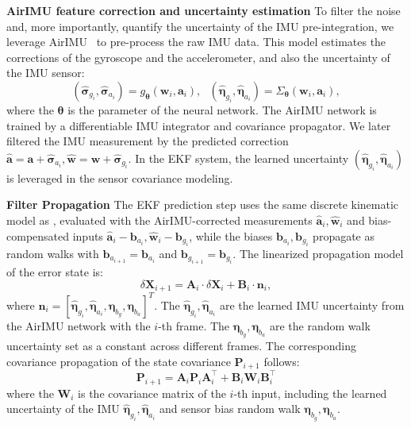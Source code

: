 \textbf{AirIMU feature correction and uncertainty estimation}
To filter the noise and, more importantly, quantify the uncertainty of the IMU pre-integration, we leverage AirIMU~\cite{qiu2023airimu} to pre-process the raw IMU data.
This model estimates the corrections of the gyroscope and the accelerometer, and also the uncertainty of the IMU sensor:
\begin{equation}
    \left(\hat{\boldsymbol{\sigma}}_{g_i}, \hat{\boldsymbol{\sigma}}_{a_i}\right) = g_{\boldsymbol{\theta}}\left(\mathbf{w}_i, \mathbf{a}_i\right), \ \ \  \left(\hat{\boldsymbol{\eta}}_{g_i}, \hat{\boldsymbol{\eta}}_{a_i}\right) = \Sigma_{\boldsymbol{\theta}}\left(\mathbf{w}_i, \mathbf{a}_i\right),
\end{equation}
where the $\mathbf{\theta}$ is the parameter of the neural network. The AirIMU network is trained by a differentiable IMU integrator and covariance propagator.
We later filtered the IMU measurement by the predicted correction $\hat{\mathbf{a}} = \mathbf{a} + \hat{\boldsymbol{\sigma}}_{a_i}, \hat{\mathbf{w}} = \mathbf{w} +  \hat{\boldsymbol{\sigma}}_{g_i}$. In the EKF system, the learned uncertainty $(\hat{\boldsymbol{\eta}}_{g_i}, \hat{\boldsymbol{\eta}}_{a_i})$ is leveraged in the sensor covariance modeling.

\textbf{Filter Propagation}
The EKF prediction step uses the same discrete kinematic model as , evaluated with the AirIMU-corrected measurements $\hat{\mathbf{a}}_i,\hat{\mathbf{w}}_i$ and bias-compensated inputs $\hat{\mathbf{a}}_i-\mathbf{b}_{a_i},\hat{\mathbf{w}}_i-\mathbf{b}_{g_i}$, while the biases $\mathbf{b}_{a_i},\mathbf{b}_{g_i}$ propagate as random walks with $\mathbf{b}_{a_{i+1}}=\mathbf{b}_{a_{i}}$ and $\mathbf{b}_{g_{i+1}}=\mathbf{b}_{g_{i}}$.
The linearized propagation model of the error state is:
\begin{equation}
\delta \mathbf{X}_{i+1} = \mathbf{A}_i \cdot \delta \mathbf{X}_i + \mathbf{B}_i \cdot \mathbf{n}_i,
\end{equation}
where $\mathbf{n}_i = [ \hat{\boldsymbol{\eta}}_{g_i}, \hat{\boldsymbol{\eta}}_{a_i}, \boldsymbol{\eta}_{b_{g}}, \boldsymbol{\eta}_{b_{a}}]^T$. The $\hat{\boldsymbol{\eta}}_{g_i}, \hat{\boldsymbol{\eta}}_{a_i}$ are the learned IMU uncertainty from the AirIMU network \cite{qiu2023airimu}
with the $i$-th frame.
The $\boldsymbol{\eta}_{b_{g}}, \boldsymbol{\eta}_{b_{a}}$ are the random walk uncertainty set as a constant across different frames. The corresponding covariance propagation of the state covariance $\mathbf{P}_{i+1}$ follows:
\begin{equation}
\mathbf{P}_{i+1} = \mathbf{A}_i \mathbf{P}_{i} \mathbf{A}_i^\top + \mathbf{B}_i \mathbf{W}_i \mathbf{B}_i^\top
\end{equation}
where the $\mathbf{W}_i$ is the covariance matrix of the $i$-th input, including the learned uncertainty of the IMU $ \hat{\boldsymbol{\eta}}_{g_i}, \hat{\boldsymbol{\eta}}_{a_i}$  and sensor bias random walk $\boldsymbol{\eta}_{b_{g}}, \boldsymbol{\eta}_{b_{a}}$.

